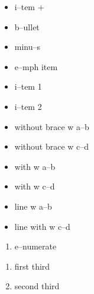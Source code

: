 \documentclass{book}
\begin{document}
\begin{titlepage}
\begin{itemize}[label=+]
\item i--tem +
\end{itemize}

\begin{itemize}[label=\textbullet{}]
\item b--ullet
\end{itemize}

\begin{itemize}[label=-]
\item minu--s
\end{itemize}

\begin{itemize}[label=\emph{after emph}]
\item e--mph item
\end{itemize}

\begin{itemize}[label=\textbullet{} a--n itemize line]
\item {}%
i--tem 1
\item i--tem 2
\end{itemize}

\begin{itemize}[label={}]
\item without brace w a--b
\item without brace w c--d
\end{itemize}

\begin{itemize}[label={}]
\item with w a--b
\item with w c--d
\end{itemize}

\begin{itemize}[label=\hbox{} on a line]
\item line w a--b
\item line with w c--d
\end{itemize}

\begin{enumerate}[start=1]
\item e--numerate
\end{enumerate}

\begin{enumerate}[start=3]
\item first third
\item second third
\end{enumerate}


\end{titlepage}
\end{document}
